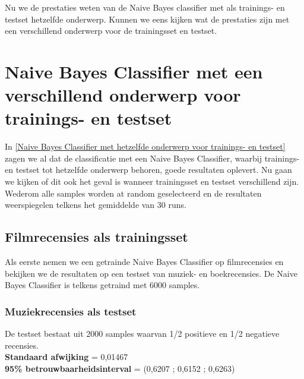 Nu we de prestaties weten van de Naive Bayes classifier met als trainings- en testset hetzelfde onderwerp. Kunnen we eens kijken wat de prestaties zijn met een verschillend onderwerp voor de trainingsset en testset.  

\section{Naive Bayes Classifier met een verschillend onderwerp voor trainings- en testset}\label{Naive Bayes Classifier met verschillend onderwerp voor trainings- en testset}

In \ref{Naive Bayes Classifier met hetzelfde onderwerp voor trainings- en testset} zagen we al dat de classificatie met een Naive Bayes Classifier, waarbij trainings- en testset tot hetzelfde onderwerp behoren, goede resultaten oplevert. Nu gaan we kijken of dit ook het geval is wanneer trainingsset en testset verschillend zijn. Wederom alle samples worden at random geselecteerd en de resultaten weerspiegelen telkens het gemiddelde van 30 runs.  

\subsection{Filmrecensies als trainingsset}\label{Filmrecensies als trainingsset}

Als eerste nemen we een getrainde Naive Bayes Classifier op filmrecensies en bekijken we de resultaten op een testset van muziek- en boekrecensies. De Naive Bayes Classifier is telkens getraind met 6000 samples.

\subsubsection{Muziekrecensies als testset}\label{Muziekrecensies als testset-movie}

De testset bestaat uit 2000 samples waarvan 1/2 positieve en 1/2 negatieve recensies.\\

\textbf{Standaard afwijking} = 0,01467\\
\textbf{95\% betrouwbaarheidsinterval} = (0,6207 ; 0,6152 ; 0,6263)\\
 
